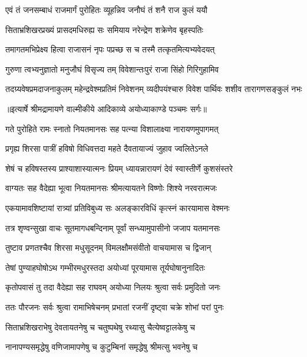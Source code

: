 \twolineshloka
{एवं तं जनसम्बाधं राजमार्गं पुरोहितः}
{व्यूहन्निव जनौघं तं शनै राज कुलं ययौ} %

\twolineshloka
{सिताभ्रशिखरप्रख्यं प्रासदमधिरुह्य सः}
{समियाय नरेन्द्रेण शक्रेणेव बृहस्पतिः} %

\twolineshloka
{तमागतमभिप्रेक्ष्य हित्वा राजासनं नृपः}
{पप्रच्छ स च तस्मै तत्कृतमित्यभ्यवेदयत्} %

\twolineshloka
{गुरुणा त्वभ्यनुज्ञातो मनुजौघं विसृज्य तम्}
{विवेशान्तःपुरं राजा सिंहो गिरिगुहामिव} %

\fourlineindentedshloka
{तदग्र्यवेषप्रमदाजनाकुलम्}
{महेन्द्रवेश्मप्रतिमं निवेशनम्}
{व्यदीपयंश्चारु विवेश पार्थिवः}
{शशीव तारागणसङ्कुलं नभः} %


{॥इत्यार्षे श्रीमद्रामायणे वाल्मीकीये आदिकाव्ये अयोध्याकाण्डे पञ्चमः सर्गः॥}


\twolineshloka
{गते पुरोहिते रामः स्नातो नियतमानसः}
{सह पत्न्या विशालाक्ष्या नारायणमुपागमत्} %

\twolineshloka
{प्रगृह्य शिरसा पात्रीं हविषो विधिवत्तदा}
{महते दैवतायाज्यं जुहाव ज्वलितेऽनले} %

\twolineshloka
{शेषं च हविषस्तस्य प्राश्याशास्यात्मनः प्रियम्}
{ध्यायन्नारायणं देवं स्वास्तीर्णे कुशसंस्तरे} %

\twolineshloka
{वाग्यतः सह वैदेह्या भूत्वा नियतमानसः}
{श्रीमत्यायतने विष्णोः शिश्ये नरवरात्मजः} %

\twolineshloka
{एकयामावशिष्टायां रात्र्यां प्रतिविबुध्य सः}
{अलङ्कारविधिं कृत्स्नं कारयामास वेश्मनः} %

\twolineshloka
{तत्र शृण्वन्सुखा वाचः सूतमागधबन्दिनाम्}
{पूर्वां सन्ध्यामुपासीनो जजाप यतमानसः} %

\twolineshloka
{तुष्टाव प्रणतश्चैव शिरसा मधुसूदनम्}
{विमलक्षौमसंवीतो वाचयामास च द्विजान्} %

\twolineshloka
{तेषां पुण्याहघोषोऽथ गम्भीरमधुरस्तदा}
{अयोध्यां पूरयामास तूर्यघोषानुनादितः} %

\twolineshloka
{कृतोपवासं तु तदा वैदेह्या सह राघवम्}
{अयोध्या निलयः श्रुत्वा सर्वः प्रमुदितो जनः} %

\twolineshloka
{ततः पौरजनः सर्वः श्रुत्वा रामाभिषेचनम्}
{प्रभातां रजनीं दृष्ट्वा चक्रे शोभां परां पुनः} %

\twolineshloka
{सिताभ्रशिखराभेषु देवतायतनेषु च}
{चतुष्पथेषु रथ्यासु चैत्येष्वट्टालकेषु च} %

\twolineshloka
{नानापण्यसमृद्धेषु वणिजामापणेषु च}
{कुटुम्बिनां समृद्धेषु श्रीमत्सु भवनेषु च} %

